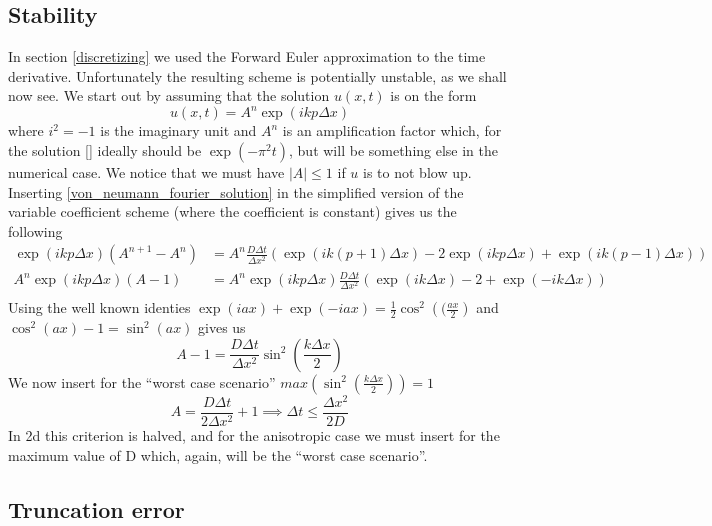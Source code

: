 \subsection{Stability}\label{stability}

In section \ref{discretizing} we used the Forward Euler approximation to the time derivative. 
Unfortunately the resulting scheme is potentially unstable, as we shall now see. 
We start out by assuming that the solution $u(x,t)$ is on the form 
\begin{equation}\label{von_neumann_fourier_solution}
 u(x,t) = A^n\exp(ikp\Delta x)
\end{equation}
where $i^2=-1$ is the imaginary unit and $A^n$ is an amplification factor which, for the solution \ref{} ideally should be $\exp(-\pi^2t)$, but will be something else in the numerical case. 
We notice that we must have $\left|A\right|\leq 1$ if $u$ is to not blow up. 
Inserting \ref{von_neumann_fourier_solution} in the simplified version of the variable coefficient scheme (where the coefficient is constant) gives us the following
\begin{align*}
 \exp(ikp\Delta x)\left(A^{n+1}-A^n\right) &= A^n\frac{D\Delta t}{\Delta x^2}\left(\exp(ik(p+1)\Delta x)-2\exp(ikp\Delta x) +\exp(ik(p-1)\Delta x)\right)\\
  A^n\exp(ikp\Delta x)\left(A-1\right) &=  A^n\exp(ikp\Delta x)\frac{D\Delta t}{\Delta x^2}\left(\exp(ik\Delta x) -2 + \exp(-ik\Delta x)\right)\\
\end{align*}
Using the well known identies $\exp(iax)+\exp(-iax) = \frac{1}{2}\cos^2\left((\frac{ax}{2}\right)$  and $\cos^2(ax)-1 = \sin^2(ax)$ gives us
\begin{equation}
 A-1 = \frac{D\Delta t}{\Delta x^2}\sin^2\left(\frac{k\Delta x}{2}\right)
\end{equation}
We now insert for the ``worst case scenario'' $max(\sin^2\left(\frac{k\Delta x}{2}\right))= 1$
\begin{equation}
 A = \frac{D\Delta t}{2\Delta x^2}+1 \implies \Delta t\leq\frac{\Delta x^2}{2D}
\end{equation}
In 2d this criterion is halved, and for the anisotropic case we must insert for the maximum value of D which, again, will be the ``worst case scenario''.



\subsection{Truncation error}\label{truncation_error}

